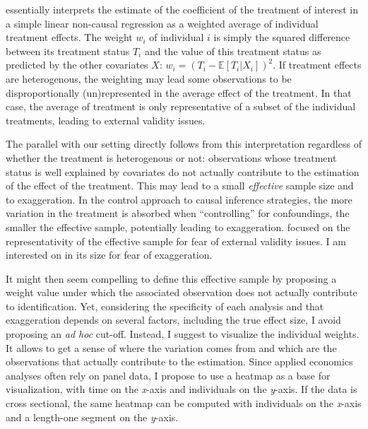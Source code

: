 \documentclass[usletter, 12pt]{article}
\begin{document}
				\cite{aronow_does_2016} essentially interprets the estimate of the coefficient of the treatment of interest in a simple linear non-causal regression as a weighted average of individual treatment effects. The weight $w_{i}$ of individual $i$ is simply the squared difference between its treatment status $T_{i}$ and the value of this treatment status as predicted by the other covariates $X$: $w_{i} = (T_{i} - \mathbb{E}[T_{i} | X_{i}])^{2}$. If treatment effects are heterogenous, the weighting may lead some observations to be disproportionally (un)represented in the average effect of the treatment. %
				In that case, the average of treatment is only representative of a subset of the individual treatments, leading to external validity issues. 
				
				The parallel with our setting directly follows from this interpretation regardless of whether the treatment is heterogenous or not: observations whose treatment status is well explained by covariates do not actually contribute to the estimation of the effect of the treatment. This may lead to a small \textit{effective} sample size and to exaggeration. In the control approach to causal inference strategies, the more variation in the treatment is absorbed when ``controlling'' for confoundings, the smaller the effective sample, potentially leading to exaggeration. \cite{aronow_does_2016} focused on the representativity of the effective sample for fear of external validity issues. I am interested on in its size for fear of exaggeration.
				
				It might then seem compelling to define this effective sample by proposing a weight value under which the associated observation does not actually contribute to  identification. Yet, considering the specificity of each analysis and that exaggeration depends on several factors, including the true effect size, I avoid proposing an \textit{ad hoc} cut-off. Instead, I suggest to visualize the individual weights. It allows to get a sense of where the variation comes from and which are the observations that actually contribute to the estimation. Since applied economics analyses often rely on panel data, I propose to use a heatmap as a base for visualization, with time on the \textit{x}-axis and individuals on the \textit{y}-axis. If the data is cross sectional, the same heatmap can be computed with individuals on the \textit{x}-axis and a length-one segment on the \textit{y}-axis.\\
				
\end{document}
